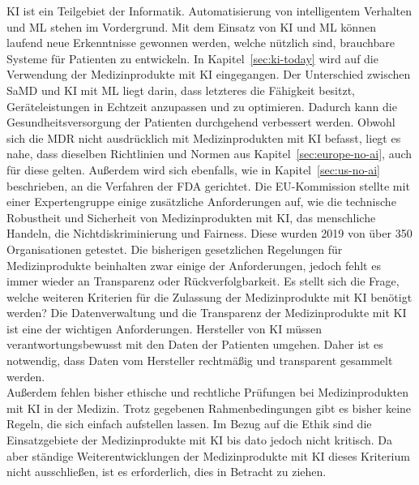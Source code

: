 KI ist ein Teilgebiet der Informatik.
Automatisierung von intelligentem Verhalten und ML stehen im Vordergrund\cite{AI_in_EU}.
Mit dem Einsatz von KI und ML können laufend neue Erkenntnisse gewonnen werden,
welche nützlich sind, brauchbare Systeme für Patienten zu entwickeln\cite{AI_in_EU}.
In Kapitel~\ref{sec:ki-today} wird auf die Verwendung der Medizinprodukte mit KI eingegangen.
Der Unterschied zwischen SaMD und KI mit ML liegt darin, dass letzteres die Fähigkeit besitzt, 
Geräteleistungen in Echtzeit anzupassen und zu optimieren\cite{AI_in_EU}.
Dadurch kann die Gesundheitsversorgung der Patienten durchgehend verbessert werden. 
Obwohl sich die MDR nicht ausdrücklich mit Medizinprodukten mit KI befasst, 
liegt es nahe, dass dieselben Richtlinien und Normen aus Kapitel~\ref{sec:europe-no-ai},
auch für diese gelten. 
Außerdem wird sich ebenfalls, wie in Kapitel~\ref{sec:us-no-ai} beschrieben, an die Verfahren der FDA gerichtet. 
Die EU-Kommission stellte mit einer Expertengruppe einige zusätzliche Anforderungen auf, wie die technische Robustheit und Sicherheit von Medizinprodukten mit KI, das menschliche Handeln, 
die Nichtdiskriminierung und Fairness. 
Diese wurden 2019 von über 350 Organisationen getestet. 
Die bisherigen gesetzlichen Regelungen für Medizinprodukte beinhalten zwar einige der Anforderungen, 
jedoch fehlt es immer wieder an Transparenz oder Rückverfolgbarkeit\cite{whitepaper}.
Es stellt sich die Frage, welche weiteren Kriterien für die Zulassung der Medizinprodukte mit KI benötigt werden?
Die Datenverwaltung und die Transparenz der Medizinprodukte mit KI ist eine der wichtigen Anforderungen.
Hersteller von KI müssen verantwortungsbewusst mit den Daten der Patienten umgehen. 
Daher ist es notwendig, dass Daten vom Hersteller rechtmäßig und transparent gesammelt werden\cite{Lessons_Learned_about_ai}.\\
Außerdem fehlen bisher ethische und rechtliche Prüfungen bei Medizinprodukten mit KI in der Medizin. 
Trotz gegebenen Rahmenbedingungen gibt es bisher keine Regeln, die sich einfach aufstellen lassen.
Im Bezug auf die Ethik sind die Einsatzgebiete der Medizinprodukte mit KI bis dato jedoch nicht kritisch.
Da aber ständige Weiterentwicklungen der Medizinprodukte mit KI dieses Kriterium nicht ausschließen, ist es erforderlich, dies in Betracht zu ziehen.